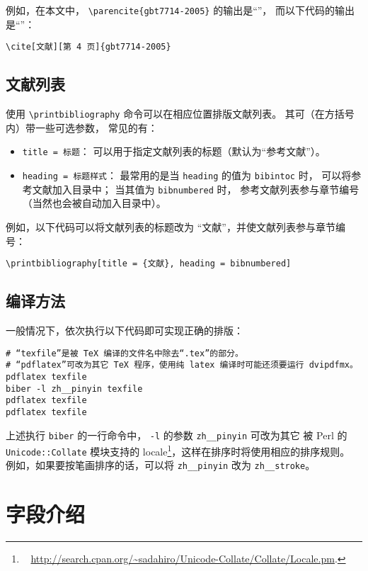 \documentclass[UTF8]{ctexart}
\newcommand*{\cupercite}[1]{\supercite{#1}\mbox{}}
\begin{document}
例如，在本文中，%
\verb|\parencite{gbt7714-2005}| 的输出是“\parencite{gbt7714-2005}”，
而以下代码的输出是“\cite[文献][第 4 页]{gbt7714-2005}”：
\begin{Verbatim}
\cite[文献][第 4 页]{gbt7714-2005}
\end{Verbatim}

\subsection{文献列表}

使用 \verb|\printbibliography| 命令可以在相应位置排版文献列表。
其可（在方括号内）带一些可选参数\cupercite{biblatex}，
常见的有：
\begin{itemize}
	\item \verb|title = 标题|：
		可以用于指定文献列表的标题（默认为“参考文献”）。
	\item \verb|heading = 标题样式|：
		最常用的是当 \verb|heading| 的值为 \verb|bibintoc| 时，
		可以将参考文献加入目录中；
		当其值为 \verb|bibnumbered| 时，
		参考文献列表参与章节编号（当然也会被自动加入目录中）。
\end{itemize}

例如，以下代码可以将文献列表的标题改为 “文献”，并使文献列表参与章节编号：
\begin{Verbatim}
\printbibliography[title = {文献}, heading = bibnumbered]
\end{Verbatim}

\subsection{编译方法}

一般情况下，依次执行以下代码即可实现正确的排版：
\begin{Verbatim}
# “texfile”是被 TeX 编译的文件名中除去“.tex”的部分。
# “pdflatex”可改为其它 TeX 程序，使用纯 latex 编译时可能还须要运行 dvipdfmx。
pdflatex texfile
biber -l zh__pinyin texfile
pdflatex texfile
pdflatex texfile
\end{Verbatim}

上述执行 \verb|biber| 的一行命令中，%
\verb|-l| 的参数 \verb|zh__pinyin| 可改为其它
被 Perl 的 \verb|Unicode::Collate| 模块支持的 locale\footnote{\ %
	\url{http://search.cpan.org/~sadahiro/Unicode-Collate/Collate/Locale.pm}.%
}，这样在排序时将使用相应的排序规则。
例如，如果要按笔画排序的话，可以将 \verb|zh__pinyin| 改为 \verb|zh__stroke|。

\section{字段介绍}\label{sec:fields}
\end{document}

